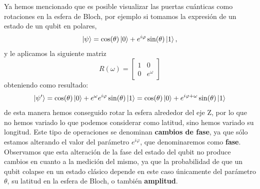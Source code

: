 \documentclass[a4paper]{article}
\numberwithin{equation}{section}
\begin{document}
Ya hemos mencionado que es posible visualizar las puertas cuánticas como rotaciones en la esfera de Bloch, por ejemplo si tomamos la expresión de un estado de un qubit en polares,
\begin{equation}
\ket{\psi} = \cos(\theta)\ket{0} + e^{i\varphi}\sin(\theta)\ket{1},
\end{equation}
y le aplicamos la siguiente matriz
\begin{equation}
R(\omega) = \begin{bmatrix}
	1 & 0 \\
	0 & e^\omega
\end{bmatrix} 
\end{equation}
obteniendo como resultado:
\begin{equation}
\ket{\psi'} = \cos(\theta)\ket{0} + e^\omega e^{i\varphi}\sin(\theta)\ket{1} = \cos(\theta)\ket{0} + e^{i\varphi + \omega}\sin(\theta)\ket{1}
\end{equation}
de esta manera hemos conseguido rotar la esfera alrededor del eje Z, por lo que no hemos variado lo que podemos considerar como latitud, sino hemos variado su longitud. Este tipo de operaciones se denominan \textbf{cambios de fase}, ya que sólo estamos alterando el valor del parámetro $e^{i\varphi}$, que denominaremos como \textbf{fase}. Observamos que esta alteración de la fase del estado del qubit no produce cambios en cuanto a la medición del mismo, ya que la probabilidad de que un qubit colapse en un estado clásico depende en este caso únicamente del parámetro $\theta$, su latitud en la esfera de Bloch, o también \textbf{amplitud}.
\end{document}
